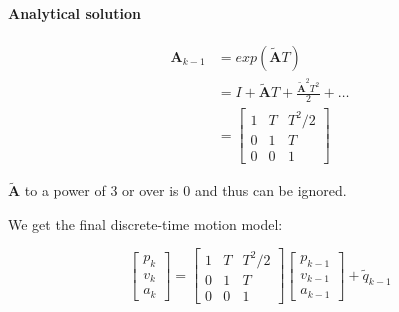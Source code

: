 \paragraph{Analytical solution}
\begin{align}
    \mathbf{A}_{k-1} & = exp(\mathbf{\tilde{A}}T) \\
    &= I + \mathbf{\tilde{A}}T + \frac{\mathbf{\tilde{A}}^2T^2}{2} + \dots \\
    &= \left[\begin{array}{ccc}
        1 & T & T^2/2 \\
        0 & 1 & T \\
        0 & 0 & 1
        \end{array}\right]
\end{align}

$\mathbf{\tilde{A}}$ to a power of 3 or over is 0 and thus can be ignored.


We get the final discrete-time motion model:

\begin{equation}
    \left[\begin{array}{c}
        p_k \\
        v_k \\
        a_k
    \end{array}\right] = \left[\begin{array}{ccc}
        1 & T & T^2/2 \\
        0 & 1 & T \\
        0 & 0 & 1
    \end{array}\right]\left[\begin{array}{c}
        p_{k-1} \\
        v_{k-1} \\
        a_{k-1}
    \end{array}\right] + \tilde{q}_{k-1}
\end{equation}